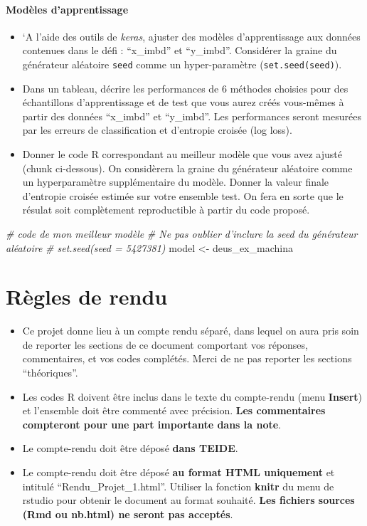 \documentclass[]{article}
\newenvironment{Shaded}{\begin{snugshade}}{\end{snugshade}}
\newcommand{\StringTok}[1]{\textcolor[rgb]{0.31,0.60,0.02}{#1}}
\newcommand{\CommentTok}[1]{\textcolor[rgb]{0.56,0.35,0.01}{\textit{#1}}}
\newcommand{\NormalTok}[1]{#1}
\let\oldparagraph\paragraph
\renewcommand{\paragraph}[1]{\oldparagraph{#1}\mbox{}}
\begin{document}
\paragraph{Modèles d'apprentissage}\label{modeles-dapprentissage}

\begin{itemize}
\item
  `A l'aide des outils de \emph{keras}, ajuster des modèles
  d'apprentissage aux données contenues dans le défi : ``x\_imbd'' et
  ``y\_imbd''. Considérer la graine du générateur aléatoire
  \texttt{seed} comme un hyper-paramètre (\texttt{set.seed(seed)}).
\item
  Dans un tableau, décrire les performances de 6 méthodes choisies pour
  des échantillons d'apprentissage et de test que vous aurez créés
  vous-mêmes à partir des données ``x\_imbd'' et ``y\_imbd''. Les
  performances seront mesurées par les erreurs de classification et
  d'entropie croisée (log loss).
\item
  Donner le code R correspondant au meilleur modèle que vous avez ajusté
  (chunk ci-dessous). On considèrera la graine du générateur aléatoire
  comme un hyperparamètre supplémentaire du modèle. Donner la valeur
  finale d'entropie croisée estimée sur votre ensemble test. On fera en
  sorte que le résulat soit complètement reproductible à partir du code
  proposé.
\end{itemize}

\begin{Shaded}
\begin{Highlighting}[]
\CommentTok{# code de mon meilleur modèle}
\CommentTok{# Ne pas oublier d'inclure la seed du générateur aléatoire }
\CommentTok{# set.seed(seed = 5427381)}
\NormalTok{  model <-}\StringTok{  }\NormalTok{deus_ex_machina}
\end{Highlighting}
\end{Shaded}

\section{Règles de rendu}\label{regles-de-rendu}

\begin{itemize}
\item
  Ce projet donne lieu à un compte rendu séparé, dans lequel on aura
  pris soin de reporter les sections de ce document comportant vos
  réponses, commentaires, et vos codes complétés. Merci de ne pas
  reporter les sections ``théoriques''.
\item
  Les codes R doivent être inclus dans le texte du compte-rendu (menu
  \textbf{Insert}) et l'ensemble doit être commenté avec précision.
  \textbf{Les commentaires compteront pour une part importante dans la
  note}.
\item
  Le compte-rendu doit être déposé \textbf{dans TEIDE}.
\item
  Le compte-rendu doit être déposé \textbf{au format HTML uniquement} et
  intitulé ``Rendu\_Projet\_1.html''. Utiliser la fonction
  \textbf{knitr} du menu de rstudio pour obtenir le document au format
  souhaité. \textbf{Les fichiers sources (Rmd ou nb.html) ne seront pas
  acceptés}.
\end{itemize}
\end{document}
